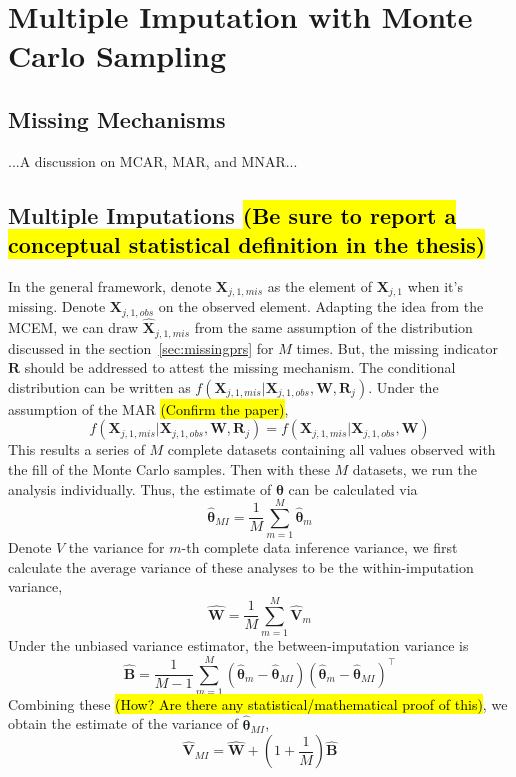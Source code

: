 \documentclass[preprint,12pt]{elsarticle}
\begin{document}
\section{Multiple Imputation with Monte Carlo Sampling}
\subsection{Missing Mechanisms}
...A discussion on MCAR, MAR, and MNAR... 
\subsection{Multiple Imputations \hl{(Be sure to report a conceptual statistical definition in the thesis)}}
In the general framework, denote $\mathbf{X}_{j,1,mis}$ as the element of $\mathbf{X}_{j,1}$ when it's missing.
Denote $\mathbf{X}_{j,1,obs}$ on the observed element. 
Adapting the idea from the MCEM, we can draw $\hat{\mathbf{X}}_{j,1,mis}$ from the same assumption of the distribution discussed in the section~\ref{sec:missingprs} for $M$ times.
But, the missing indicator $\mathbf{R}$ should be addressed to attest the missing mechanism. 
The conditional distribution can be written as $f(\mathbf{X}_{j,1,mis}|\mathbf{X}_{j,1,obs}, \mathbf{W}, \mathbf{R}_j)$. 
Under the assumption of the MAR \hl{(Confirm the paper)}, 
\begin{equation}
    f(\mathbf{X}_{j,1,mis}|\mathbf{X}_{j,1,obs}, \mathbf{W}, \mathbf{R}_j)=f(\mathbf{X}_{j,1,mis}|\mathbf{X}_{j,1,obs}, \mathbf{W})
\end{equation}
This results a series of $M$ complete datasets containing all values observed with the fill of the Monte Carlo samples. 
Then with these $M$ datasets, we run the analysis individually. 
Thus, the estimate of $\boldsymbol{\theta}$ can be calculated via 
\begin{equation}
    \hat{\boldsymbol{\theta}}_{MI}=\frac{1}{M}\sum_{m=1}^M\hat{\boldsymbol{\theta}}_m
\end{equation}
Denote $V$ the variance for $m$-th complete data inference variance, we first calculate the average variance of these analyses to be the within-imputation variance,
\begin{equation}
    \hat{\mathbf{W}}=\frac{1}{M}\sum_{m=1}^M\hat{\mathbf{V}}_m 
\end{equation}
Under the unbiased variance estimator, the between-imputation variance is
\begin{equation}
    \hat{\mathbf{B}}=\frac{1}{M-1}\sum_{m=1}^M (\hat{\boldsymbol{\theta}}_m - \hat{\boldsymbol{\theta}}_{MI})(\hat{\boldsymbol{\theta}}_m - \hat{\boldsymbol{\theta}}_{MI})^{\top}
\end{equation}
Combining these \hl{(How? Are there any statistical/mathematical proof of this)}, we obtain the estimate of the variance of $\hat{\boldsymbol{\theta}}_{MI}$,
\begin{equation}
    \hat{\mathbf{V}}_{MI}=\hat{\mathbf{W}}+(1+\frac{1}{M})\hat{\mathbf{B}}
\end{equation}
\end{document}
